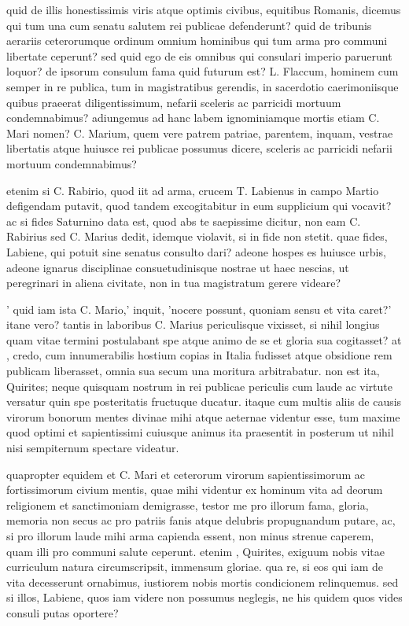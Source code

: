  quid de illis honestissimis viris atque optimis civibus, equitibus Romanis, dicemus qui tum una cum senatu salutem rei publicae defenderunt? quid de tribunis aerariis ceterorumque ordinum omnium hominibus qui tum arma pro communi libertate ceperunt? sed quid ego de eis omnibus qui consulari imperio paruerunt loquor? de ipsorum consulum fama quid futurum est? L. Flaccum, hominem cum semper in re publica, tum in magistratibus gerendis, in sacerdotio caerimoniisque quibus praeerat diligentissimum, nefarii sceleris ac parricidi mortuum condemnabimus? adiungemus ad hanc labem ignominiamque mortis etiam C. Mari nomen? C. Marium, quem vere patrem patriae, parentem, inquam, vestrae libertatis atque huiusce rei publicae possumus dicere, sceleris ac parricidi nefarii mortuum condemnabimus?

 etenim si C. Rabirio, quod iit ad arma, crucem T. Labienus in campo Martio defigendam putavit, quod tandem excogitabitur in eum supplicium qui vocavit? ac si fides Saturnino data est, quod abs te saepissime dicitur, non eam C. Rabirius sed C. Marius dedit, idemque violavit, si in fide non stetit. quae fides, Labiene, qui potuit sine senatus consulto dari? adeone hospes es huiusce urbis, adeone ignarus disciplinae consuetudinisque nostrae ut haec nescias, ut peregrinari in aliena civitate, non in tua magistratum gerere videare?

 ' quid iam ista C. Mario,' inquit, 'nocere possunt, quoniam sensu et vita caret?' itane vero? tantis in laboribus C. Marius periculisque vixisset, si nihil longius quam vitae termini postulabant spe atque animo de se et gloria sua cogitasset? at , credo, cum innumerabilis hostium copias in Italia fudisset atque obsidione rem publicam liberasset, omnia sua secum una moritura arbitrabatur. non est ita, Quirites; neque quisquam nostrum in rei publicae periculis cum laude ac virtute versatur quin spe posteritatis fructuque ducatur. itaque cum multis aliis de causis virorum bonorum mentes divinae mihi atque aeternae videntur esse, tum maxime quod optimi et sapientissimi cuiusque animus ita praesentit in posterum ut nihil nisi sempiternum spectare videatur.

 quapropter equidem et C. Mari et ceterorum virorum sapientissimorum ac fortissimorum civium mentis, quae mihi videntur ex hominum vita ad deorum religionem et sanctimoniam demigrasse, testor me pro illorum fama, gloria, memoria non secus ac pro patriis fanis atque delubris propugnandum putare, ac, si pro illorum laude mihi arma capienda essent, non minus strenue caperem, quam illi pro communi salute ceperunt. etenim , Quirites, exiguum nobis vitae curriculum natura circumscripsit, immensum gloriae. qua re, si eos qui iam de vita decesserunt ornabimus, iustiorem nobis mortis condicionem relinquemus. sed si illos, Labiene, quos iam videre non possumus neglegis, ne his quidem quos vides consuli putas oportere?

